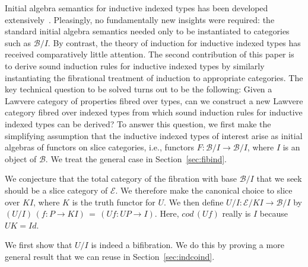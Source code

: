 \documentclass{LMCS}
\newcommand{\ra}{\rightarrow}
\newcommand\E{{\mathcal E}}
\newcommand\B{{\mathcal B}}
\theoremstyle{plain}
\theoremstyle{remark}
\theoremstyle{definition}
\begin{document}
Initial algebra semantics for inductive indexed types has been
developed extensively~\cite{dyb94,ma09}. Pleasingly, no fundamentally
new insights were required: the standard initial algebra semantics
needed only to be instantiated to categories such as $\B/I$. By
contrast, the theory of induction for inductive indexed types has
received comparatively little attention. The second contribution of
this paper is to derive sound induction rules for inductive indexed
types by similarly instantiating the fibrational treatment of
induction to appropriate categories.  The key technical question to be
solved turns out to be the following: Given a Lawvere category of
properties fibred over types, can we construct a new Lawvere category
fibred over indexed types from which sound induction rules for
inductive indexed types can be derived? To answer this question, we
first make the simplifying assumption that the inductive indexed types
of interest arise as initial algebras of functors on slice categories,
i.e., functors $F:\B/I \ra \B/I$, where $I$ is an object of $\B$. We
treat the general case in Section~\ref{sec:fibind}.

We conjecture that the total category of the fibration with base
$\B/I$ that we seek should be a slice category of $\E$. We therefore
make the canonical choice to slice over $KI$, where $K$ is the truth
functor for $U$. We then define $U/I:\E/KI \ra \B/I$ by $(U/I) \, (f:P
\ra KI)\, =\, (Uf : UP \ra I)$. Here, $\mathit{cod} \,(Uf)$ really is
$I$ because $UK = \mathit{Id}$.

We first show that $U/I$ is indeed a bifibration. We do this by
proving a more general result that we can reuse in
Section~\ref{sec:indcoind}. 
\end{document}
